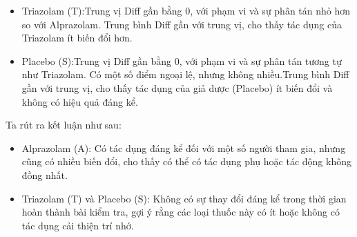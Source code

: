 \begin{itemize}
\begin{itemize}
\begin{itemize}
            \item Triazolam (T):Trung vị Diff gần bằng 0, với phạm vi và sự phân tán nhỏ hơn so với Alprazolam. Trung bình Diff gần với trung vị, cho thấy tác dụng của Triazolam ít biến đổi hơn.
            \item Placebo (S):Trung vị Diff gần bằng 0, với phạm vi và sự phân tán tương tự như Triazolam. Có một số điểm ngoại lệ, nhưng không nhiều.Trung bình Diff gần với trung vị, cho thấy tác dụng của giả dược (Placebo) ít biến đổi và không có hiệu quả đáng kể.
        \end{itemize}
        Ta rút ra kết luận như sau:
        \begin{itemize}
            \item Alprazolam (A): Có tác dụng đáng kể đối với một số người tham gia, nhưng cũng có nhiều biến đổi, cho thấy có thể có tác dụng phụ hoặc tác động không đồng nhất.
            \item  Triazolam (T) và Placebo (S): Không có sự thay đổi đáng kể trong thời gian hoàn thành bài kiểm tra, gợi ý rằng các loại thuốc này có ít hoặc không có tác dụng cải thiện trí nhớ.
        \end{itemize}
    \end{itemize}


\end{itemize}
